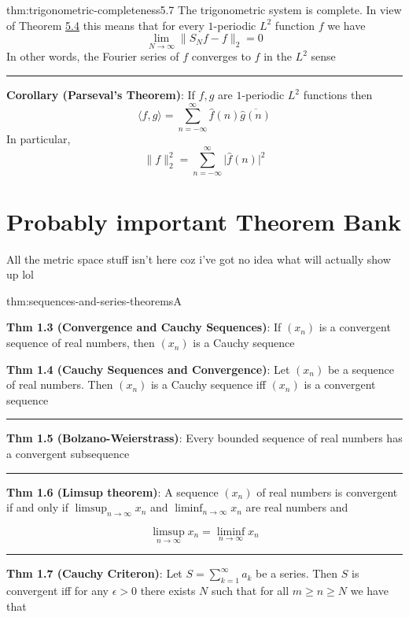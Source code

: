 \documentclass[landscape, 8pt]{extarticle}
\begin{document}
\begin{multicols}{3}
\vspace{-5pt}
\begin{thm}{thm:trigonometric-completeness}{5.7}
	\vspace{-5pt}
	The trigonometric system is complete. In view of Theorem \hyperref[dfn:complete-orthonormal-system]{5.4} this means that for every $1$-periodic $L^{2}$ function $f$ we have
	\[\lim_{N\to \infty} \lVert S_{N} f - f \rVert_{2} = 0\]
	In other words, the Fourier series of $f$ converges to $f$ in the $L^{2}$ sense

	\noindent\rule{\textwidth}{0.2pt}
	\textbf{Corollary (Parseval's Theorem)}: If $f, g$ are $1$-periodic $L^{2}$ functions then
	\[\langle f, g \rangle = \sum_{n = -\infty}^{\infty} \widehat{f}(n) \overline{\widehat{g}(n)}\]
	In particular,
	\[\lVert f \rVert^{2}_{2} = \sum_{n = -\infty}^{\infty} \lvert \widehat{f}(n) \rvert^{2}\]
\end{thm}

\newpage

\section{Probably important Theorem Bank}
All the metric space stuff isn't here coz i've got no idea what will actually show up lol

\begin{thm}{thm:sequences-and-series-theorems}{A}
	
	\textbf{Thm 1.3 (Convergence and Cauchy Sequences)}: If $(x_{n})$ is a convergent sequence of real numbers, then $(x_{n})$ is a Cauchy sequence

	\textbf{Thm 1.4 (Cauchy Sequences and Convergence)}: Let $(x_{n})$ be a sequence of real numbers. Then $(x_{n})$ is a Cauchy sequence iff $(x_{n})$ is a convergent sequence

	\noindent\rule{\textwidth}{0.2pt}
	\textbf{Thm 1.5 (Bolzano-Weierstrass)}: Every bounded sequence of real numbers has a convergent subsequence


	\noindent\rule{\textwidth}{0.2pt}
	\textbf{Thm 1.6 (Limsup theorem)}: A sequence $(x_{n})$ of real numbers is convergent if and only if $\limsup_{n \to \infty}x_{n}$ and $\liminf_{n \to \infty}x_{n}$ are real numbers and

	\[\limsup_{n \to \infty} x_{n} = \liminf_{n \to \infty} x_{n}\]

	\noindent\rule{\textwidth}{0.2pt}

	\textbf{Thm 1.7 (Cauchy Criteron)}: Let $S=\sum_{k=1}^{\infty}a_{k}$ be a series. Then $S$ is convergent iff for any $\epsilon>0$ there exists $N$ such that for all $m\ge n\ge N$ we have that


\end{thm}
\end{multicols}
\end{document}

